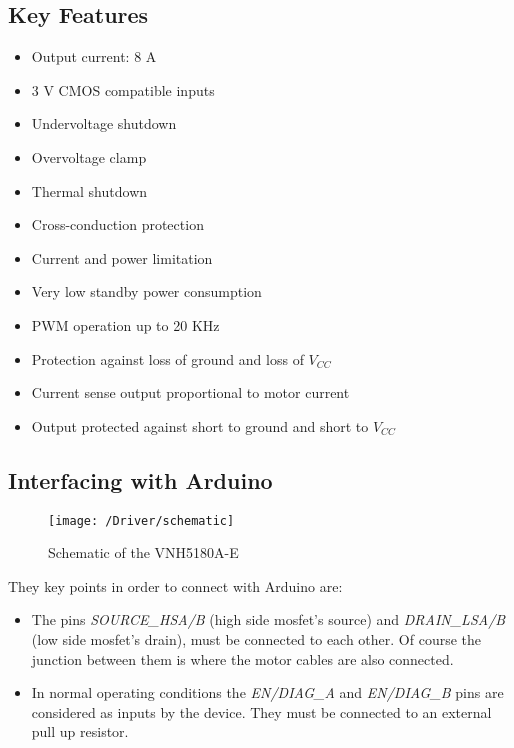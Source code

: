 \subsection{Key Features}

\begin{itemize}
	\item Output current: 8 A
	\item 3 V CMOS compatible inputs
	\item Undervoltage shutdown
	\item Overvoltage clamp
	\item Thermal shutdown
	\item Cross-conduction protection
	\item Current and power limitation
	\item Very low standby power consumption
	\item PWM operation up to 20 KHz
	\item Protection against loss of ground and loss of $V_{CC}$
	\item Current sense output proportional to motor current
	\item Output protected against short to ground and short to $V_{CC}$
\end{itemize}

\subsection{Interfacing with Arduino} \label{subsec:driver-arduino}

\begin{figure}[h!]
	\begin{center}
		\texttt{[image: /Driver/schematic]}
		\caption{Schematic of the VNH5180A-E}
		\label{Fig:schematic_driver}
	\end{center}
\end{figure}

They key points in order to connect with Arduino are:

\begin{itemize}
	\item The pins \textit{SOURCE\_HSA/B} (high side mosfet's source) and \textit{DRAIN\_LSA/B} (low side mosfet's drain), must be connected to each other. Of course the junction between them is where the motor cables are also connected.
	\item In normal operating conditions the \textit{EN/DIAG\_A} and \textit{EN/DIAG\_B} pins are considered as inputs by the device. They must be connected to an external pull up resistor. 
\end{itemize}

